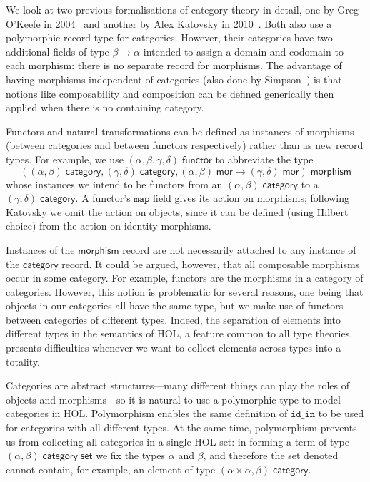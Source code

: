 \documentclass[twoside,titlepage,11pt]{article}
\begin{document}
We look at two previous formalisations of category theory in detail, one by Greg O'Keefe in 2004~\cite{DBLP:journals/entcs/OKeefe04} and another by Alex Katovsky in 2010~\cite{Katovsky}.
Both also use a polymorphic record type for categories.
However, their categories have two additional fields of type $\beta\to\alpha$ intended to assign a domain and codomain to each morphism: there is no separate record for morphisms.
The advantage of having morphisms independent of categories (also done by Simpson~\cite{Simpson04}) is that notions like composability and composition can be defined generically then applied when there is no containing category.

Functors and natural transformations can be defined as instances of morphisms (between categories and between functors respectively) rather than as new record types.
For example, we use $(\alpha,\beta,\gamma,\delta)\;\mathsf{functor}$ to abbreviate the type \[((\alpha,\beta)\;\mathsf{category},(\gamma,\delta)\;\mathsf{category},(\alpha,\beta)\;\mathsf{mor}\to(\gamma,\delta)\;\mathsf{mor})\;\mathsf{morphism}\] whose instances we intend to be functors from an $(\alpha,\beta)\;\mathsf{category}$ to a $(\gamma,\delta)\;\mathsf{category}$.
A functor's $\mathtt{map}$ field gives its action on morphisms; following Katovsky we omit the action on objects, since it can be defined (using Hilbert choice) from the action on identity morphisms.

Instances of the $\mathsf{morphism}$ record are not necessarily attached to any instance of the $\mathsf{category}$ record.
It could be argued, however, that all composable morphisms occur in some category.
For example, functors are the morphisms in a category of categories.
However, this notion is problematic for several reasons, one being that objects in our categories all have the same type, but we make use of functors between categories of different types.
Indeed, the separation of elements into different types in the semantics of HOL, a feature common to all type theories, presents difficulties whenever we want to collect elements across types into a totality.

Categories are abstract structures---many different things can play the roles of objects and morphisms---so it is natural to use a polymorphic type to model categories in HOL.
Polymorphism enables the same definition of $\mathtt{id\_in}$ to be used for categories with all different types.
At the same time, polymorphism prevents us from collecting all categories in a single HOL set: in forming a term of type $(\alpha,\beta)\;\mathsf{category}\;\mathsf{set}$ we fix the types $\alpha$ and $\beta$, and therefore the set denoted cannot contain, for example, an element of type $(\alpha\times\alpha,\beta)\;\mathsf{category}$.
\end{document}
